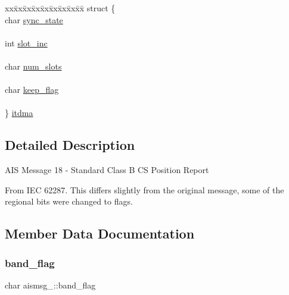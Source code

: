 \begin{DoxyCompactItemize}
\begin{tabbing}
\end{tabbing}\item 
\begin{tabbing}
xx\=xx\=xx\=xx\=xx\=xx\=xx\=xx\=xx\=\kill
struct \{\\
\>char \mbox{\hyperlink{structaismsg__18_a4a94651585d0b788d0151005f241dabc}{sync\_state}}\\
\>\\
\>int \mbox{\hyperlink{structaismsg__18_a80e83dbf4ef32580917e2f9633390d23}{slot\_inc}}\\
\>\\
\>char \mbox{\hyperlink{structaismsg__18_ae59291c0775b0395e27a2449afcebc52}{num\_slots}}\\
\>\\
\>char \mbox{\hyperlink{structaismsg__18_a0889a91dcd3df97a40cf5720ec31aeb1}{keep\_flag}}\\
\>\\
\} \mbox{\hyperlink{structaismsg__18_a018b2d5d49193b49409ce2f2fdfbace8}{itdma}}\\

\end{tabbing}\end{DoxyCompactItemize}


\subsection{Detailed Description}
A\+IS Message 18 -\/ Standard Class B CS Position Report

From I\+EC 62287. This differs slightly from the original message, some of the regional bits were changed to flags. 

\subsection{Member Data Documentation}
\mbox{\label{structaismsg__18_ab0cfca849d733ab353d842ea47f17ed2}} 
\subsubsection{\texorpdfstring{band\+\_\+flag}{band\_flag}}
{\footnotesize\ttfamily char aismsg\+\_\+::band\+\_\+flag}




